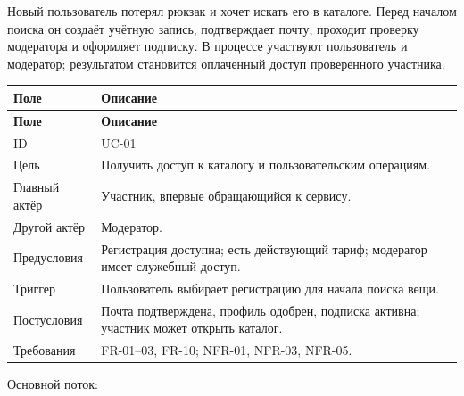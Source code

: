 Новый пользователь потерял рюкзак и хочет искать его в каталоге. Перед началом поиска он создаёт учётную запись, подтверждает почту, проходит проверку модератора и оформляет подписку. В процессе участвуют пользователь и модератор; результатом становится оплаченный доступ проверенного участника.

\begingroup
{}
\fontsize{12}{14}\selectfont
\setlength{\tablecontentwidth}{\dimexpr\linewidth-4\tabcolsep-3\arrayrulewidth\relax}
\begin{longtable}{|>{\RaggedRight\arraybackslash}p{0.25\tablecontentwidth}|>{\RaggedRight\arraybackslash}p{0.75\tablecontentwidth}|}
\hline
\textbf{Поле} & \textbf{Описание} \\ \hline
\endfirsthead
\textbf{Поле} & \textbf{Описание} \\ \hline
\endhead
\endfoot
\endlastfoot
ID & UC-01 \\ \hline
Цель & Получить доступ к каталогу и пользовательским операциям. \\ \hline
Главный актёр & Участник, впервые обращающийся к сервису. \\ \hline
Другой актёр & Модератор. \\ \hline
Предусловия & Регистрация доступна; есть действующий тариф; модератор имеет служебный доступ. \\ \hline
Триггер & Пользователь выбирает регистрацию для начала поиска вещи. \\ \hline
Постусловия & Почта подтверждена, профиль одобрен, подписка активна; участник может открыть каталог. \\ \hline
Требования & FR-01–03, FR-10; NFR-01, NFR-03, NFR-05. \\ \hline
\end{longtable}
\endgroup

Основной поток:

